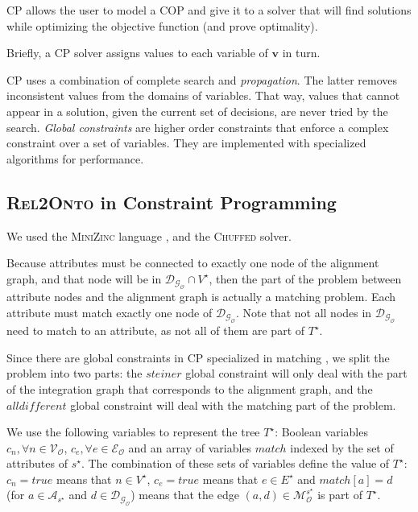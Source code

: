 \documentclass[letterpaper]{article} %
\newcommand{\minizinc}{\textsc{MiniZinc}}
\newcommand{\chuffed}{\textsc{Chuffed}}
\newcommand{\relonto}{\textsc{Rel2Onto}}
\newcommand{\ignore}[1]{}
\newcommand{\forijcai}[1]{}
\begin{document}
CP allows the user to model a COP and give it 
to a solver that will find solutions while optimizing 
the objective function (and prove optimality).

Briefly, a CP solver assigns values to each variable of 
$\boldsymbol{v}$ in turn. 
\ignore{At each iteration it will check whether any 
constraint in $C$ is violated, in which case it will backtrack to change its 
last decision. \ignore{The choice of the order of the variables to be assigned, 
and the 
choice of the value to be assigned to each variable is called the \emph{search 
strategy}.}}
CP uses a combination of complete search and \emph{propagation}. The latter
removes inconsistent values 
from the domains of variables. That way, values that cannot appear in a 
solution, given the current set of decisions, are never tried by the search. 
\emph{Global constraints} are higher order constraints that enforce a 
complex 
constraint over a set of variables. They are implemented with 
specialized algorithms for performance.


\subsection{\relonto{} in Constraint Programming\label{SEC:rel2ontocp}}
We used the \minizinc{} language 
\cite{minizinc}, and the 
\chuffed{} solver. \cite{chu2011improving}\forijcai{ because it has a global constraint 
implemented for Steiner 
Tree Problems \cite{deuna2016steiner}. The model can be found in Appendix \ref{Ann:MZ}}

Because attributes must be connected to exactly one node of the alignment 
graph, and that node will be in $\mathcal{D_{G_O}} \cap V^\star$, 
then the part of the problem between attribute nodes and the alignment graph is 
actually a matching problem. Each attribute must match exactly one node of 
$\mathcal{D_{G_O}}$. Note that not all nodes in $\mathcal{D_{G_O}}$ need to match 
to an attribute, as not all of them are part of $T^\star$.

Since there are global constraints in CP specialized in matching 
\cite{regin1994filtering}, we split the problem into two parts: the 
$\mathit{steiner}$ global constraint \cite{deuna2016steiner} will only deal with the part of the 
integration graph that corresponds to the alignment graph, and the 
$\mathit{alldifferent}$ global constraint will deal with the matching part of 
the problem.

We use the following variables to represent the tree $T^\star$: Boolean 
variables $c_n,\forall n \in 
\mathcal{V_O}$, $c_e, \forall e \in	\mathcal{E_O}$ and an array of variables 
$match$ indexed by the set of attributes of $s^\star$. The combination of these 
sets of variables define the value of $T^\star$: $c_n = \mathit{true}$ means 
that $n \in V^\star$, $c_e = \mathit{true}$ means that $e \in E^\star$ and 
$match[a] = d$ (for $a \in \mathcal{A}_{s^\star}$ and $d \in 
\mathcal{D_{G_O}}$) means that the edge $(a,d) \in 
\mathcal{M}_\mathcal{O}^{s^\star}$ is part of $T^\star$.
\end{document}
